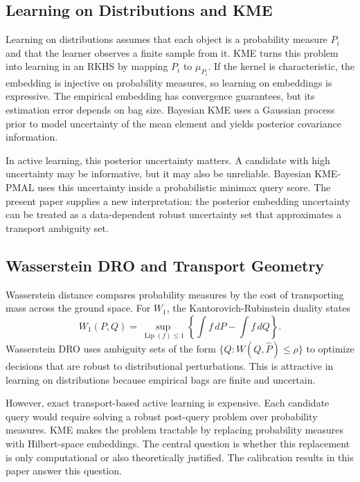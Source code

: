 \documentclass[10pt,journal]{IEEEtran}
\DeclareMathOperator{\Lip}{Lip}
\newcommand{\wh}{\widehat}
\begin{document}
\subsection{Learning on Distributions and KME}

Learning on distributions assumes that each object is a probability measure $P_i$ and that the learner observes a finite sample from it. KME turns this problem into learning in an RKHS by mapping $P_i$ to $\mu_{P_i}$. If the kernel is characteristic, the embedding is injective on probability measures, so learning on embeddings is expressive. The empirical embedding has convergence guarantees, but its estimation error depends on bag size. Bayesian KME uses a Gaussian process prior to model uncertainty of the mean element and yields posterior covariance information.

In active learning, this posterior uncertainty matters. A candidate with high uncertainty may be informative, but it may also be unreliable. Bayesian KME-PMAL uses this uncertainty inside a probabilistic minimax query score. The present paper supplies a new interpretation: the posterior embedding uncertainty can be treated as a data-dependent robust uncertainty set that approximates a transport ambiguity set.

\subsection{Wasserstein DRO and Transport Geometry}

Wasserstein distance compares probability measures by the cost of transporting mass across the ground space. For $W_1$, the Kantorovich-Rubinstein duality states
\begin{equation}
    W_1(P,Q)=\sup_{\Lip(f)\le 1}\left\{\int f\,dP-\int f\,dQ\right\}.
\end{equation}
Wasserstein DRO uses ambiguity sets of the form $\{Q:W(Q,\wh P)\le \rho\}$ to optimize decisions that are robust to distributional perturbations. This is attractive in learning on distributions because empirical bags are finite and uncertain.

However, exact transport-based active learning is expensive. Each candidate query would require solving a robust post-query problem over probability measures. KME makes the problem tractable by replacing probability measures with Hilbert-space embeddings. The central question is whether this replacement is only computational or also theoretically justified. The calibration results in this paper answer this question.
\end{document}
